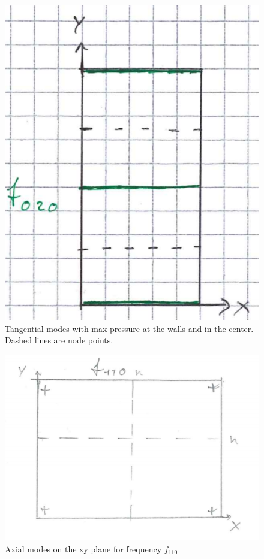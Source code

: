\documentclass{article}
\begin{document}
\begin{figure}[H]
    \centering
    \includegraphics{figures/oving2_5_solution.png}
    \caption{Tangential modes with max pressure at the walls and in the center. Dashed lines are node points.}
    \label{fig:3}
\end{figure}

\begin{figure}
    \centering
    \includegraphics{figures/oving2_8_solution.png}
    \caption{Axial modes on the xy plane for frequency $f_{110}$}
    \label{fig:4}
\end{figure}
\end{document}
